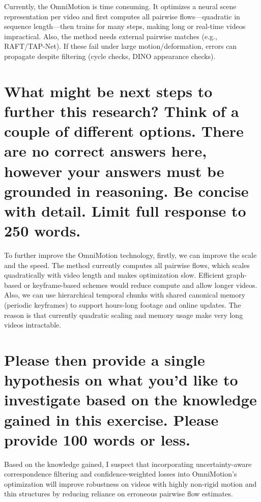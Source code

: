 \documentclass{article}
\begin{document}
Currently, the OmniMotion is time consuming. It optimizes a neural scene representation per video and first computes all pairwise flows—quadratic in sequence length—then trains for many steps, making long or real-time videos impractical. Also, the method needs external pairwise matches (e.g., RAFT/TAP-Net). If these fail under large motion/deformation, errors can propagate despite filtering (cycle checks, DINO appearance checks).


\section{What might be next steps to further this research? Think of a couple of different options. There are no correct answers here, however your answers must be grounded in reasoning. Be concise with detail. Limit full response to 250 words.}

To further improve the OmniMotion technology, firstly, we can improve the scale and the speed. The method currently computes all pairwise flows, which scales quadratically with video length and makes optimization slow. Efficient graph-based or keyframe-based schemes would reduce compute and allow longer videos. Also, we can use hierarchical temporal chunks with shared canonical memory (periodic keyframes) to support hours-long footage and online updates. The reason is that currently quadratic scaling and memory usage make very long videos intractable.

\section{Please then provide a single hypothesis on what you'd like to investigate based on the knowledge gained in this exercise. Please provide 100 words or less.}

Based on the knowledge gained, I suspect that incorporating uncertainty-aware correspondence filtering and confidence-weighted losses into OmniMotion’s optimization will improve robustness on videos with highly non-rigid motion and thin structures by reducing reliance on erroneous pairwise flow estimates.
\end{document}
